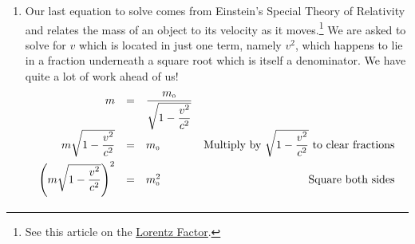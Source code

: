 \documentclass{ximera}
\begin{document}
{{{\begin{example}
\begin{enumerate}
\[\begin{array}{rclr}
 \dfrac{r_{\text{\tiny$1$}}}{r_{\text{\tiny$2$}}} & = &  \sqrt{\dfrac{M_{\text{\tiny$2$}}}{M_{\text{\tiny$1$}}}} & \\[8pt]

\left(\dfrac{r_{\text{\tiny$1$}}}{r_{\text{\tiny$2$}}}\right)^2 & = & \left(\sqrt{\dfrac{M_{\text{\tiny$2$}}}{M_{\text{\tiny$1$}}}}\right)^2 & \text{Square both sides} \\[8pt]

\dfrac{r_{\text{\tiny$1$}}^2}{r_{\text{\tiny$2$}}^2} & = & \dfrac{M_{\text{\tiny$2$}}}{M_{\text{\tiny$1$}}} & \\[8pt]

r_{\text{\tiny$1$}}^2 M_{\text{\tiny$1$}} & = & M_{\text{\tiny$2$}}r_{\text{\tiny$2$}}^2 & \text{Multiply by $r_{\text{\tiny$2$}}^2 M_{\text{\tiny$1$}}$ to clear fractions, assume $r_{\text{\tiny$2$}}$,  $M_{\text{\tiny$1$}} \neq 0$ } \\[2pt]


M_{\text{\tiny$1$}} & = & \dfrac{M_{\text{\tiny$2$}}r_{\text{\tiny$2$}}^2}{r_{\text{\tiny$1$}}^2} & \text{Divide by $r_{\text{\tiny$1$}}^2$, assume $r_{\text{\tiny$1$}} \neq 0$} \\
\end{array} \] As the reader may expect, checking the answer amounts to a good exercise in simplifying rational and radical expressions.  The fact that we are assuming all of the variables represent positive real numbers comes in to play, as well.

\item  Our last equation to solve comes from Einstein's Special Theory of Relativity and relates the mass of an object to its velocity as it moves.\footnote{See this article on the \href{http://en.wikipedia.org/wiki/Lorentz_factor}{\underline{Lorentz Factor}}.} We are asked to solve for $v$ which is located in just one term, namely $v^2$, which happens to lie in a fraction underneath a square root which is itself a denominator. We have quite a lot of work ahead of us!\[ \begin{array}{rclr}

 m &  = & \dfrac{m_{\text{\tiny$0$}}}{\sqrt{1 - \dfrac{v^2}{c^2}}} & \\

m \sqrt{1 - \dfrac{v^2}{c^2}} & = & m_{\text{\tiny$0$}} & \text{Multiply by $\sqrt{1 - \dfrac{v^2}{c^2}}$ to clear fractions}\\ [8pt]

\left(m \sqrt{1 - \dfrac{v^2}{c^2}}\right)^{2} & = & m_{\text{\tiny$0$}}^{2} & \text{Square both sides}\\ [12pt]


\end{array}\]
\end{enumerate}
\end{example}}}}
\end{document}
